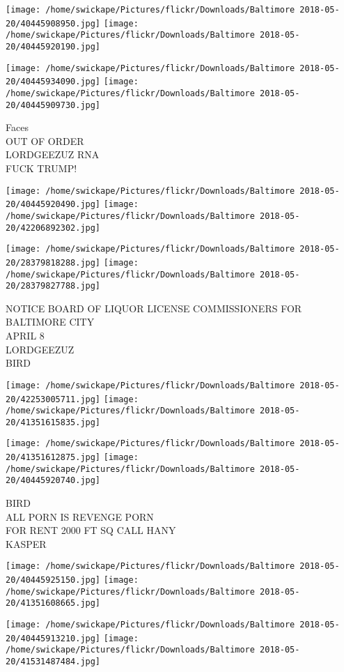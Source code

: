 \documentclass[10pt,letterpaper]{article}
\begin{document}
\texttt{[image: /home/swickape/Pictures/flickr/Downloads/Baltimore 2018-05-20/40445908950.jpg]}
\texttt{[image: /home/swickape/Pictures/flickr/Downloads/Baltimore 2018-05-20/40445920190.jpg]}

\texttt{[image: /home/swickape/Pictures/flickr/Downloads/Baltimore 2018-05-20/40445934090.jpg]}
\texttt{[image: /home/swickape/Pictures/flickr/Downloads/Baltimore 2018-05-20/40445909730.jpg]}

Faces\\
OUT OF ORDER\\
LORDGEEZUZ RNA\\
FUCK TRUMP!
\pagebreak

\texttt{[image: /home/swickape/Pictures/flickr/Downloads/Baltimore 2018-05-20/40445920490.jpg]}
\texttt{[image: /home/swickape/Pictures/flickr/Downloads/Baltimore 2018-05-20/42206892302.jpg]}

\texttt{[image: /home/swickape/Pictures/flickr/Downloads/Baltimore 2018-05-20/28379818288.jpg]}
\texttt{[image: /home/swickape/Pictures/flickr/Downloads/Baltimore 2018-05-20/28379827788.jpg]}

NOTICE BOARD OF LIQUOR LICENSE COMMISSIONERS FOR BALTIMORE CITY\\
APRIL 8\\
LORDGEEZUZ\\
BIRD
\pagebreak

\texttt{[image: /home/swickape/Pictures/flickr/Downloads/Baltimore 2018-05-20/42253005711.jpg]}
\texttt{[image: /home/swickape/Pictures/flickr/Downloads/Baltimore 2018-05-20/41351615835.jpg]}

\texttt{[image: /home/swickape/Pictures/flickr/Downloads/Baltimore 2018-05-20/41351612875.jpg]}
\texttt{[image: /home/swickape/Pictures/flickr/Downloads/Baltimore 2018-05-20/40445920740.jpg]}

BIRD\\
ALL PORN IS REVENGE PORN\\
FOR RENT 2000 FT SQ CALL HANY\\
KASPER
\pagebreak

\texttt{[image: /home/swickape/Pictures/flickr/Downloads/Baltimore 2018-05-20/40445925150.jpg]}
\texttt{[image: /home/swickape/Pictures/flickr/Downloads/Baltimore 2018-05-20/41351608665.jpg]}

\texttt{[image: /home/swickape/Pictures/flickr/Downloads/Baltimore 2018-05-20/40445913210.jpg]}
\texttt{[image: /home/swickape/Pictures/flickr/Downloads/Baltimore 2018-05-20/41531487484.jpg]}
\end{document}
